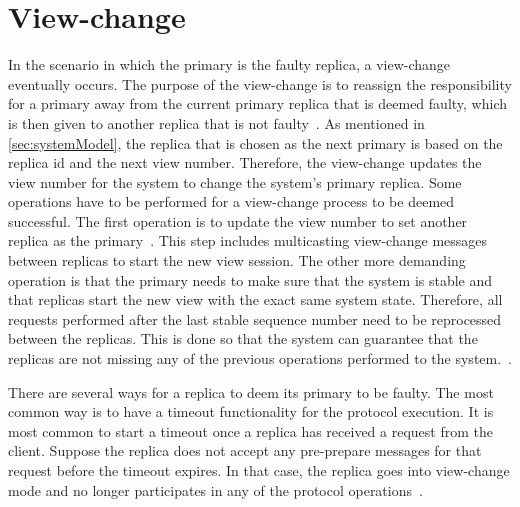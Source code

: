 \section{View-change}
\label{sec:view-change}
In the scenario in which the primary is the faulty replica, a view-change eventually occurs. The purpose of the view-change is to reassign the responsibility for a primary away from the current primary replica that is deemed faulty, which is then given to another replica that is not faulty~\cites{WEB:PBFTConSeries}[p.262]{BOOK:BuildDepDistSyst}. As mentioned in \autoref{sec:systemModel}, the replica that is chosen as the next primary is based on the replica id and the next view number. Therefore, the view-change updates the view number for the system to change the system’s primary replica. Some operations have to be performed for a view-change process to be deemed successful. The first operation is to update the view number to set another replica as the primary~\cites[p.~6]{PAPER:OGPBFT}[p.~411]{PAPER:PBFTRecovery}{WEB:SawtoothPBFT}. This step includes multicasting view-change messages between replicas to start the new view session. The other more demanding operation is that the primary needs to make sure that the system is stable and that replicas start the new view with the exact same system state. Therefore, all requests performed after the last stable sequence number need to be reprocessed between the replicas. This is done so that the system can guarantee that the replicas are not missing any of the previous operations performed to the system.~\cites[p.~458]{BOOK:MVstandver3}[p.~263-265]{BOOK:BuildDepDistSyst}.

There are several ways for a replica to deem its primary to be faulty. The most common way is to have a timeout functionality for the protocol execution. It is most common to start a timeout once a replica has received a request from the client. Suppose the replica does not accept any pre-prepare messages for that request before the timeout expires. In that case, the replica goes into view-change mode and no longer participates in any of the protocol operations~\cites{SLIDES:PBFT}[p.~5-6]{PAPER:OGPBFT}[p.~263]{BOOK:BuildDepDistSyst}.  

